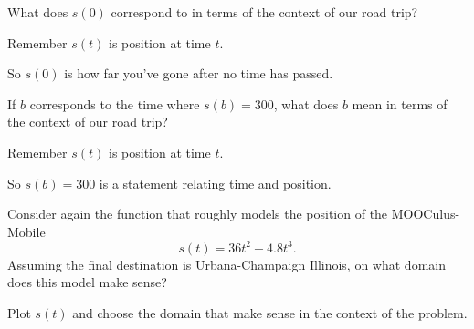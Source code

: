 \documentclass{ximera}
\begin{document}
\begin{problem} %
What does $s(0)$ correspond to in terms of the context of our road
trip?
\begin{hint}
Remember $s(t)$ is position at time $t$.
\end{hint}
\begin{hint}
So $s(0)$ is how far you've gone after no time has passed. 
\end{hint}
\begin{prompt} %
  \begin{multipleChoice}
  \end{multipleChoice}
\end{prompt}
\end{problem}

\begin{problem} %
If $b$ corresponds to the time where $s(b) = 300$, what does $b$ mean
in terms of the context of our road trip?
\begin{hint}
Remember $s(t)$ is position at time $t$.
\end{hint}
\begin{hint}
So $s(b)=300$ is a statement relating time and position.  
\end{hint}
\begin{prompt} %
  \begin{multipleChoice}
  \end{multipleChoice}
\end{prompt}
\end{problem}


\begin{problem} %
Consider again the function that roughly models the position of the
MOOCulus-Mobile
\[
s(t) = 36t^2 -4.8t^3.
\]
Assuming the final destination is Urbana-Champaign Illinois, on what
domain does this model make sense?
\begin{hint}
  Plot $s(t)$ and choose the domain that make sense in the context of
  the problem.
\end{hint}
\end{problem}
\end{document}
